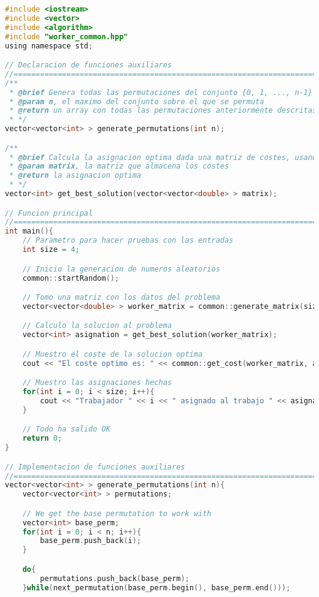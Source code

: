 \documentclass[10pt, a4paper]{article}
\theoremstyle{theorem-style}
\theoremstyle{theorem-style}
\theoremstyle{definition-style}
\theoremstyle{remark-style}
\theoremstyle{example-style}
\theoremstyle{definition-style}
\theoremstyle{remark-style}
\begin{document}
\begin{lstlisting}[language=C]
#include <iostream>
#include <vector>
#include <algorithm>
#include "worker_common.hpp"
using namespace std;

// Declaracion de funciones auxiliares
//==============================================================================
/**
 * @brief Genera todas las permutaciones del conjunto {0, 1, ..., n-1}
 * @param n, el maximo del conjunto sobre el que se permuta
 * @return un array con todas las permutaciones anteriormente descritas
 * */
vector<vector<int> > generate_permutations(int n);

/**
 * @brief Calcula la asignacion optima dada una matriz de costes, usando fuerza bruta
 * @param matrix, la matriz que almacena los costes
 * @return la asignacion optima
 * */
vector<int> get_best_solution(vector<vector<double> > matrix);

// Funcion principal
//==============================================================================
int main(){
    // Parametro para hacer pruebas con las entradas
    int size = 4;

    // Inicio la generacion de numeros aleatorios
    common::startRandom();

    // Tomo una matriz con los datos del problema
    vector<vector<double> > worker_matrix = common::generate_matrix(size);

    // Calculo la solucion al problema
    vector<int> asignation = get_best_solution(worker_matrix);

    // Muestro el coste de la solucion optima
    cout << "El coste optimo es: " << common::get_cost(worker_matrix, asignation) << endl;

    // Muestro las asignaciones hechas
    for(int i = 0; i < size; i++){
        cout << "Trabajador " << i << " asignado al trabajo " << asignation[i] << endl;
    }

    // Todo ha salido OK
    return 0;
}

// Implementacion de funciones auxiliares
//==============================================================================
vector<vector<int> > generate_permutations(int n){
    vector<vector<int> > permutations;

    // We get the base permutation to work with
    vector<int> base_perm;
    for(int i = 0; i < n; i++){
        base_perm.push_back(i);
    }

    do{
        permutations.push_back(base_perm);
    }while(next_permutation(base_perm.begin(), base_perm.end()));



\end{lstlisting}
\end{document}
